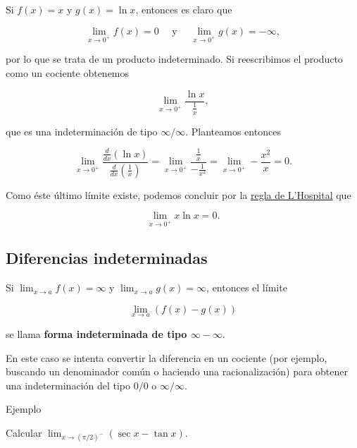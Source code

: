 \documentclass[
  letterpaper,
]{book}
\theoremstyle{plain}
\theoremstyle{remark}
\begin{document}
\begin{tcolorbox}[enhanced jigsaw, opacityback=0, left=2mm, opacitybacktitle=0.6, toprule=.15mm, bottomrule=.15mm, colbacktitle=quarto-callout-tip-color!10!white, titlerule=0mm, bottomtitle=1mm, title=\textcolor{quarto-callout-tip-color}{\faLightbulb}\hspace{0.5em}{Solución}, toptitle=1mm, colframe=quarto-callout-tip-color-frame, colback=white, breakable, rightrule=.15mm, arc=.35mm, leftrule=.75mm, coltitle=black]

Si \(f(x)=x\) y \(g(x)=\ln x\), entonces es claro que

\[
\lim_{x\to 0^+} f(x)=0 \quad \text{ y } \quad \lim_{x\to 0^+} g(x)=-\infty, 
\]

por lo que se trata de un producto indeterminado. Si reescribimos el
producto como un cociente obtenemos

\[
\lim_{x\to 0^+} \frac{\ln x}{\frac{1}{x}},
\]

que es una indeterminación de tipo \(\infty/\infty\). Planteamos
entonces

\[
\lim_{x\to 0^+} \frac{\frac{d}{dx}(\ln x)}{\frac{d}{dx}\left(\frac{1}{x}\right)}=\lim_{x\to 0^+} \frac{\frac{1}{x}}{-\frac{1}{x^2}}=\lim_{x\to 0^+} -\frac{x^2}{x}=0.
\]

Como éste último límite existe, podemos concluir por la
\hyperref[teo-regla-LH]{regla de L'Hospital} que

\[
\lim_{x\to 0^+}x\ln x = 0.
\]

\end{tcolorbox}

\subsection{Diferencias
indeterminadas}\label{diferencias-indeterminadas}

Si \(\displaystyle \lim_{x\to a}f(x)=\infty\) y
\(\lim_{x\to a}g(x)= \infty\), entonces el límite

\[
\lim_{x\to a}\left(f(x)-g(x)\right)
\]

se llama \textbf{forma indeterminada de tipo \(\infty - \infty\)}.

En este caso se intenta convertir la diferencia en un cociente (por
ejemplo, buscando un denominador común o haciendo una racionalización)
para obtener una indeterminación del tipo \(0/0\) o \(\infty/\infty\).

Ejemplo

Calcular \(\lim_{x\to (\pi/2)^-}\left(\sec x-\tan x\right)\).
\end{document}
